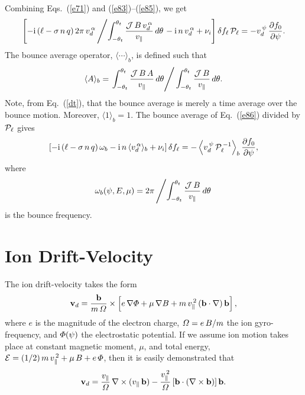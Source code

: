 \documentclass[12pt,prb,aps,notitlepage]{revtex4-1}
\begin{document}
 Combining Eqs.~(\ref{e71}) and (\ref{e83})--(\ref{e85}), we get 
 \begin{equation}\label{e86}
 \left[-{\rm i}\,(\ell-\sigma\,n\,q)\,2\pi\,v_d^{\,\alpha}\left/\int_{-\theta_t}^{\theta_t}\frac{{\cal J}\,B\,v_d^{\,\alpha}}{v_\parallel}\,d\theta\right.-
 {\rm i}\,n\,v_d^{\,\alpha}+\nu_i\right]\delta f_{\ell}\,{\cal P}_{\ell} = - v_d^{\,\psi}\,\frac{\partial f_0}{\partial\psi}.
 \end{equation}
 The bounce average operator, $\langle \cdots\rangle_b$, is defined such that
 \begin{equation}\label{bounce}
 \langle A\rangle_b =\left.\int_{-\theta_t}^{\theta_t}\frac{{\cal J}\,B\,A}{v_\parallel}\,d\theta\right/ \int_{-\theta_t}^{\theta_t}\frac{{\cal J}\,B}{v_\parallel}\,d\theta.
 \end{equation}
 Note, from Eq.~(\ref{dt}), that the bounce average is merely a time average over the bounce motion.  Moreover,  $\langle 1\rangle_b =1$. 
 The bounce average of Eq.~(\ref{e86}) divided by ${\cal P}_{\ell}$ gives
 \begin{equation}\label{e91}
 \left[-{\rm i}\,(\ell-\sigma\,n\,q)\,\omega_b -{\rm i}\,n\,\langle v_d^{\,\alpha}\rangle_b+\nu_i\right]\delta f_{\ell} = -
 \left\langle v_d^{\,\psi}\,{\cal P}_{\ell}^{\,-1}\right\rangle_b\frac{\partial f_0}{\partial\psi},
 \end{equation}
 where
 \begin{equation}
 \omega_b(\psi,E,\mu) = 2\pi\left/\int_{-\theta_t}^{\theta_t}\frac{{\cal J}\,B}{v_\parallel}\,d\theta\right.
 \end{equation}
 is the bounce frequency. 
 
\section{Ion Drift-Velocity}
The ion drift-velocity takes the form
\begin{equation}
{\bf v}_d =\frac{{\bf b}}{m\,{\mit\Omega}}\times\left[e\,\nabla{\mit\Phi}+ \mu\,\nabla B + m\,v_\parallel^{\,2}\,({\bf b}\cdot\nabla)\,{\bf b}\right],
\end{equation}
where $e$ is the magnitude of the electron charge, ${\mit\Omega}=e\,B/m$  the ion gyro-frequency, and ${\mit\Phi}(\psi)$  the
electrostatic potential. If we assume ion motion takes place at constant magnetic moment, $\mu$, and total energy,
 ${\cal E}= (1/2)\,m\,v_\parallel^{\,2}+ \mu\,B+e\,{\mit\Phi}$, then it is easily
 demonstrated that
 \begin{equation}
 {\bf v}_d = \frac{v_\parallel}{{\mit\Omega}}\,\nabla\times (v_\parallel\,{\bf b}) - \frac{v_\parallel^{\,2}}{{\mit\Omega}}\,[{\bf b}\cdot(\nabla\times {\bf b})]\,{\bf b}.
 \end{equation}
 
\end{document}
